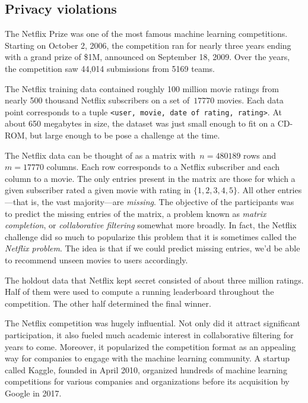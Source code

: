 \documentclass{tufte-book}
\begin{document}
\hypertarget{privacy-violations}{%
\subsection{Privacy violations}\label{privacy-violations}}

The Netflix Prize was one of the most famous machine learning
competitions. Starting on October 2, 2006, the competition ran for
nearly three years ending with a grand prize of \$1M, announced on
September 18, 2009. Over the years, the competition saw 44,014
submissions from 5169 teams.

The Netflix training data contained roughly 100 million movie ratings
from nearly 500 thousand Netflix subscribers on a set of~\(17770\)
movies. Each data point corresponds to a tuple
\texttt{\textless{}user,\ movie,\ date\ of\ rating,\ rating\textgreater{}}.
At about 650 megabytes in size, the dataset was just small enough to fit
on a CD-ROM, but large enough to be pose a challenge at the time.

The Netflix data can be thought of as a matrix with~\(n=480189\) rows
and \(m=17770\) columns. Each row corresponds to a Netflix subscriber
and each column to a movie. The only entries present in the matrix are
those for which a given subscriber rated a given movie with rating in
\(\{1,2,3,4,5\}\). All other entries---that is, the vast majority---are
\emph{missing}. The objective of the participants was to predict the
missing entries of the matrix, a problem known as \emph{matrix
completion}, or \emph{collaborative filtering} somewhat more broadly. In
fact, the Netflix challenge did so much to popularize this problem that
it is sometimes called the \emph{Netflix problem}. The idea is that if
we could predict missing entries, we'd be able to recommend unseen
movies to users accordingly.

The holdout data that Netflix kept secret consisted of about three
million ratings. Half of them were used to compute a running leaderboard
throughout the competition. The other half determined the final
winner.

The Netflix competition was hugely influential. Not only did it attract
significant participation, it also fueled much academic interest in
collaborative filtering for years to come. Moreover, it popularized the
competition format as an appealing way for companies to engage with the
machine learning community. A startup called Kaggle, founded in April
2010, organized hundreds of machine learning competitions for various
companies and organizations before its acquisition by Google in 2017.
\end{document}
